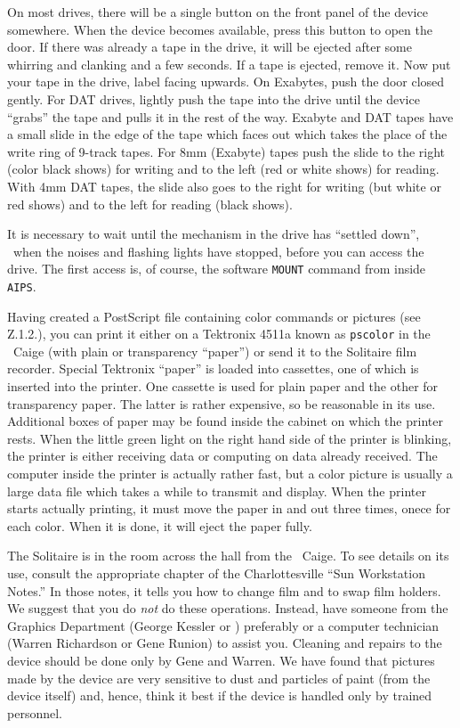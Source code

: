      On most drives, there will be a single button on the front panel
of the device somewhere.  When the device becomes available, press
this button to open the door.  If there was already a tape in the
drive, it will be ejected after some whirring and clanking and a few
seconds.  If a tape is ejected, remove it.  Now put your tape in the
drive, label facing upwards.  On Exabytes, push the door closed
gently.  For DAT drives, lightly push the tape into the drive until
the device ``grabs'' the tape and pulls it in the rest of the way.
Exabyte and DAT tapes have a small slide in the edge of the tape which
faces out which takes the place of the write ring of 9-track tapes.
For 8mm (Exabyte) tapes push the slide to the right (color black
shows) for writing and to the left (red or white shows) for reading.
With 4mm DAT tapes, the slide also goes to the right for writing (but
white or red shows) and to the left for reading (black shows).

     It is necessary to wait until the mechanism in the drive has
``settled down'', \ie\ when the noises and flashing lights have stopped,
before you can access the drive.  The first access is, of course, the
software {\tt MOUNT} command from inside \hbox{{\tt AIPS}}.

\vfill\eject
{}

     Having created a PostScript file containing color commands or
pictures (see \Secs Z.1.2.), you can print it either on a Tektronix
4511a  known as {\tt pscolor} in the \AIPS\ Caige (with
plain or transparency ``paper'') or send it to the Solitaire film
recorder.  Special Tektronix ``paper'' is loaded into cassettes, one
of which is inserted into the printer.  One cassette is used for plain
paper and the other for transparency paper.  The latter is rather
expensive, so be reasonable in its use.  Additional boxes of paper may
be found inside the cabinet on which the printer rests.  When the
little green light on the right hand side of the printer is blinking,
the printer is either receiving data or computing on data already
received.  The computer inside the printer is actually rather fast, but
a color picture is usually a large data file which takes a while to
transmit and display.  When the printer starts actually printing, it
must move the paper in and out three times, onece for each color.
When it is done, it will eject the paper fully.

     The Solitaire  is in the room across the hall
from the \AIPS\ Caige.  To see details on its use, consult the
appropriate chapter of the Charlottesville ``Sun Workstation Notes.''
In those notes, it tells you how to change film and to swap film
holders.  We suggest that you do {\it not} do these operations.
Instead, have someone from the Graphics Department (George Kessler or
) preferably or a computer technician (Warren
Richardson or Gene Runion) to assist you.  Cleaning and repairs to the
device should be done only by Gene and Warren.  We have found that
pictures made by the device are very sensitive to dust and particles
of paint (from the device itself) and, hence, think it best if the
device is handled only by trained personnel.

